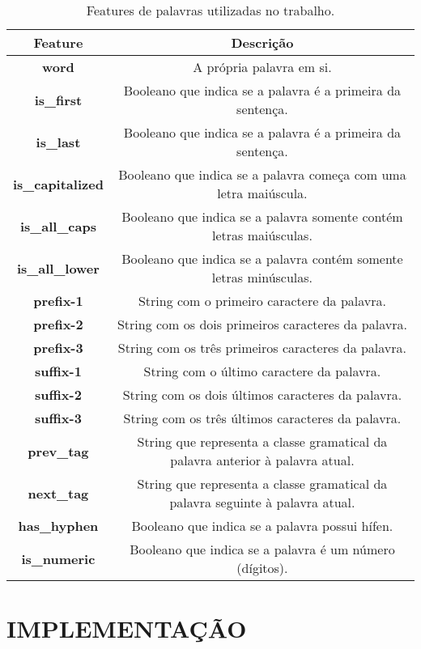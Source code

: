 \documentclass[12pt]{article}
\begin{document}
\begin{table}[h]
	\centering
	\begin{tabular}{|c|c|}
		\hline
		\textbf{Feature} & \textbf{Descrição} \\ \hline
		\textbf{word} & A própria palavra em si. \\ \hline
		\textbf{is\_first} & Booleano que indica se a palavra é a primeira da sentença. \\ \hline
		\textbf{is\_last} & Booleano que indica se a palavra é a primeira da sentença. \\ \hline
		\textbf{is\_capitalized} & Booleano que indica se a palavra começa com uma letra maiúscula. \\ \hline
		\textbf{is\_all\_caps} & Booleano que indica se a palavra somente contém
		letras maiúsculas. \\ \hline
		\textbf{is\_all\_lower} & Booleano que indica se a palavra contém somente
		letras minúsculas. \\ \hline
		\textbf{prefix-1} & String com o primeiro caractere da palavra. \\ \hline
		\textbf{prefix-2} & String com os dois primeiros caracteres da palavra. \\ \hline
		\textbf{prefix-3} & String com os três primeiros caracteres da palavra. \\ \hline
		\textbf{suffix-1} & String com o último caractere da palavra. \\ \hline
		\textbf{suffix-2} & String com os dois últimos caracteres da palavra. \\ \hline
		\textbf{suffix-3} & String com os três últimos caracteres da palavra. \\ \hline
		\textbf{prev\_tag} & String que representa a classe gramatical da palavra
		anterior à palavra atual. \\ \hline
		\textbf{next\_tag} & String que representa a classe gramatical da palavra
		seguinte à palavra atual. \\ \hline
		\textbf{has\_hyphen} & Booleano que indica se a palavra possui hífen.
		\\ \hline
		\textbf{is\_numeric} & Booleano que indica se a palavra é um número
		(dígitos). \\ \hline
	\end{tabular}
	\caption{\label{tab:features} Features de palavras utilizadas no trabalho.}
\end{table}

\section{IMPLEMENTAÇÃO}
\end{document}
